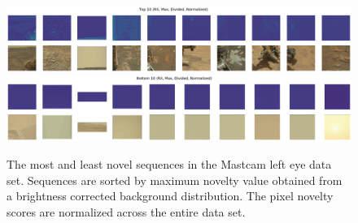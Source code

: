 \begin{figure}
\centering
\includegraphics[width=\linewidth]{figs/msl/top10.jpg}
\includegraphics[width=\linewidth]{figs/msl/bottom10.jpg}
\caption{The most and least novel sequences in the Mastcam left eye data set. Sequences are sorted by maximum novelty value obtained from a brightness corrected background distribution. The pixel novelty scores  are normalized across the entire data set.}
\label{msl/fig:sorted}
\end{figure}


